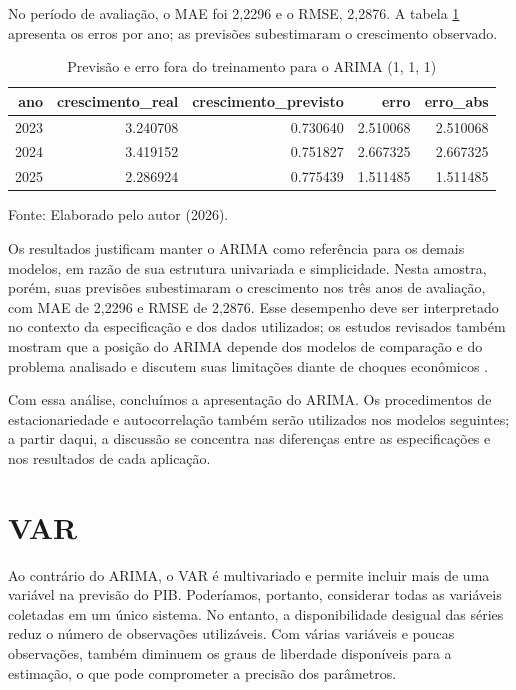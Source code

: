 No período de avaliação, o MAE foi 2,2296 e o RMSE, 2,2876. A tabela \ref{tab:resultados_arima} apresenta os erros por ano; as previsões subestimaram o crescimento observado.


\begin{table}[htbp]
	\centering
	\captionsetup{justification=centering}
	\caption{Previsão e erro fora do treinamento para o ARIMA (1, 1, 1)}
	\label{tab:resultados_arima}
	\begin{tabular}{rrrrr}
		\toprule
		ano & crescimento\_real & crescimento\_previsto & erro & erro\_abs \\
		\midrule
		2023 & 3.240708 & 0.730640 & 2.510068 & 2.510068 \\
		2024 & 3.419152 & 0.751827 & 2.667325 & 2.667325 \\
		2025 & 2.286924 & 0.775439 & 1.511485 & 1.511485 \\
		\bottomrule
	\end{tabular}
	
	\vspace{0.1cm}
	
	\centering
	\small Fonte: Elaborado pelo autor (2026).
\end{table}

Os resultados justificam manter o ARIMA como referência para os demais modelos, em razão de sua estrutura univariada e simplicidade. Nesta amostra, porém, suas previsões subestimaram o crescimento nos três anos de avaliação, com MAE de 2,2296 e RMSE de 2,2876. Esse desempenho deve ser interpretado no contexto da especificação e dos dados utilizados; os estudos revisados também mostram que a posição do ARIMA depende dos modelos de comparação e do problema analisado  e discutem suas limitações diante de choques econômicos .

Com essa análise, concluímos a apresentação do ARIMA. Os procedimentos de estacionariedade e autocorrelação também serão utilizados nos modelos seguintes; a partir daqui, a discussão se concentra nas diferenças entre as especificações e nos resultados de cada aplicação.


\section{VAR}

Ao contrário do ARIMA, o VAR é multivariado e permite incluir mais de uma variável na previsão do PIB. Poderíamos, portanto, considerar todas as variáveis coletadas em um único sistema. No entanto, a disponibilidade desigual das séries reduz o número de observações utilizáveis. Com várias variáveis e poucas observações, também diminuem os graus de liberdade disponíveis para a estimação, o que pode comprometer a precisão dos parâmetros.

